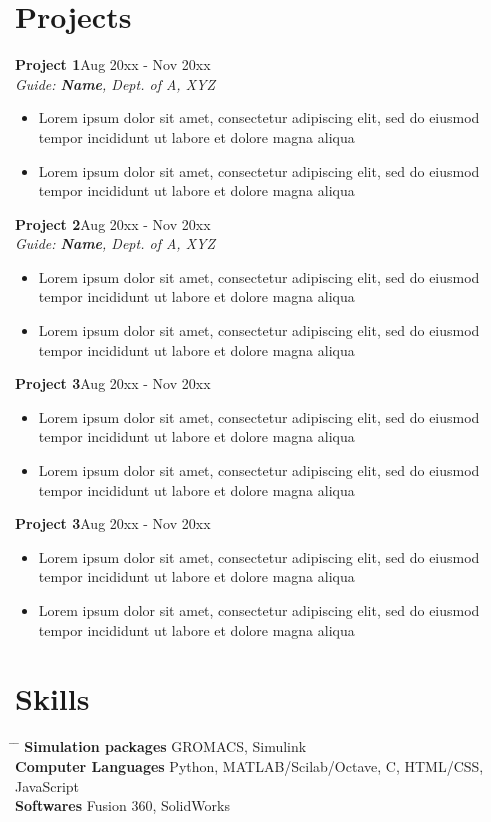 \documentclass[10pt]{article}
\begin{document}
\section{Projects}
	{\bf Project 1}\hfill Aug 20xx - Nov 20xx\\
	{\it Guide: {\bf Name}, Dept. of A, XYZ}
	\begin{itemize}
	\setlength\itemsep{0.4px}
	\item{Lorem ipsum dolor sit amet, consectetur adipiscing elit, sed do eiusmod tempor incididunt ut labore et dolore magna aliqua}
	\item{Lorem ipsum dolor sit amet, consectetur adipiscing elit, sed do eiusmod tempor incididunt ut labore et dolore magna aliqua}
	\end{itemize}
	{\bf Project 2}\hfill Aug 20xx - Nov 20xx\\
	{\it Guide: {\bf Name}, Dept. of A, XYZ}
	\begin{itemize}
	\setlength\itemsep{0.4px}
	\item{Lorem ipsum dolor sit amet, consectetur adipiscing elit, sed do eiusmod tempor incididunt ut labore et dolore magna aliqua}
	\item{Lorem ipsum dolor sit amet, consectetur adipiscing elit, sed do eiusmod tempor incididunt ut labore et dolore magna aliqua}
	\end{itemize}
	{\bf Project 3}\hfill Aug 20xx - Nov 20xx
	\begin{itemize}
	\setlength\itemsep{0.4px}
	\item{Lorem ipsum dolor sit amet, consectetur adipiscing elit, sed do eiusmod tempor incididunt ut labore et dolore magna aliqua}
	\item{Lorem ipsum dolor sit amet, consectetur adipiscing elit, sed do eiusmod tempor incididunt ut labore et dolore magna aliqua}
	\end{itemize}
	{\bf Project 3}\hfill Aug 20xx - Nov 20xx
	\begin{itemize}
	\setlength\itemsep{0.4px}
	\item{Lorem ipsum dolor sit amet, consectetur adipiscing elit, sed do eiusmod tempor incididunt ut labore et dolore magna aliqua}
	\item{Lorem ipsum dolor sit amet, consectetur adipiscing elit, sed do eiusmod tempor incididunt ut labore et dolore magna aliqua}
	\end{itemize}

\section{Skills}
	\vspace{-0.5cm}
	\parbox{\textwidth}{ 
		\begin{tabbing} 
			\hspace{5cm} \= \hspace{4cm} \= \kill 
			{\bf Simulation packages} \> GROMACS, Simulink\\		
			{\bf Computer Languages} \> Python, MATLAB/Scilab/Octave, C, HTML/CSS, JavaScript\\ 
			{\bf Softwares} \> Fusion 360, SolidWorks\\
		\end{tabbing}
	}
\end{document}
